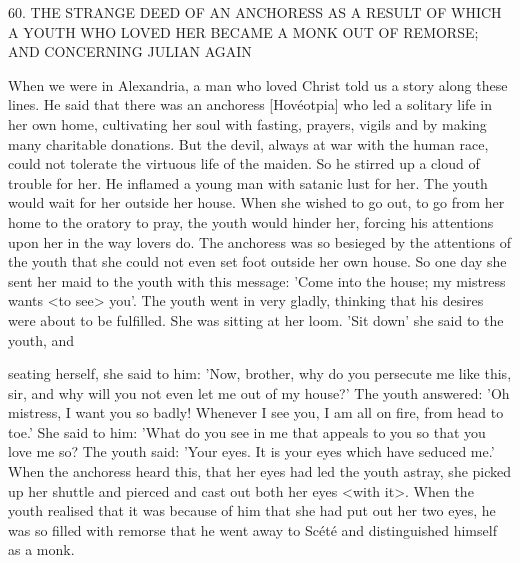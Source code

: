 60.
THE STRANGE DEED OF AN ANCHORESS
AS A RESULT OF WHICH A YOUTH
WHO LOVED HER BECAME A MONK
OUT OF REMORSE;
AND CONCERNING JULIAN AGAIN

When we were in Alexandria, a man who loved Christ told us a
story along these lines.
He said that there was an anchoress
[Hovéotpia] who led a solitary life in her own home, cultivating
her soul with fasting, prayers, vigils and by making many charitable
donations.
But the devil, always at war with the human race, could
not tolerate the virtuous life of the maiden.
So he stirred up a cloud
of trouble for her.
He inflamed a young man with satanic lust for
her.
The youth would wait for her outside her house.
When she
wished to go out, to go from her home to the oratory to pray, the
youth would hinder her, forcing his attentions upon her in the way
lovers do.
The anchoress was so besieged by the attentions of the
youth that she could not even set foot outside her own house.
So
one day she sent her maid to the youth with this message: 'Come
into the house; my mistress wants <to see> you'.
The youth went in
very gladly, thinking that his desires were about to be fulfilled.
She
was sitting at her loom.
'Sit down' she said to the youth, and

seating herself, she said to him: 'Now, brother, why do you
persecute me like this, sir, and why will you not even let me out of
my house?' The youth answered: 'Oh mistress, I want you so badly!
Whenever I see you, I am all on fire, from head to toe.' She said to
him: 'What do you see in me that appeals to you so that you love
me so? The youth said: 'Your eyes.
It is your eyes which have
seduced me.' When the anchoress heard this, that her eyes had led
the youth astray, she picked up her shuttle and pierced and cast out
both her eyes <with it>.
When the youth realised that it was
because of him that she had put out her two eyes, he was so filled
with remorse that he went away to Scété and distinguished himself
as a monk.

